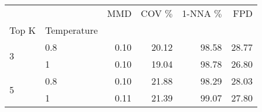 \begin{tabular}{llrrrr}
  \toprule
                        &             & MMD  & COV  \(\%\) & 1-NNA  \(\%\) & FPD   \\
  Top K                 & Temperature &      &             &               &       \\
  \midrule
  \multirow[t]{2}{*}{3} & 0.8         & 0.10 & 20.12       & 98.58         & 28.77 \\
                        & 1           & 0.10 & 19.04       & 98.78         & 26.80 \\
  \cline{1-6}
  \multirow[t]{2}{*}{5} & 0.8         & 0.10 & 21.88       & 98.29         & 28.03 \\
                        & 1           & 0.11 & 21.39       & 99.07         & 27.80 \\
  \cline{1-6}
  \bottomrule
\end{tabular}